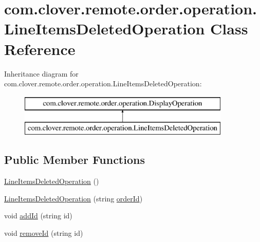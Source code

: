 \hypertarget{classcom_1_1clover_1_1remote_1_1order_1_1operation_1_1_line_items_deleted_operation}{}\section{com.\+clover.\+remote.\+order.\+operation.\+Line\+Items\+Deleted\+Operation Class Reference}
\label{classcom_1_1clover_1_1remote_1_1order_1_1operation_1_1_line_items_deleted_operation}
Inheritance diagram for com.\+clover.\+remote.\+order.\+operation.\+Line\+Items\+Deleted\+Operation\+:\begin{figure}[H]
\begin{center}
\leavevmode
\includegraphics[height=2.000000cm]{classcom_1_1clover_1_1remote_1_1order_1_1operation_1_1_line_items_deleted_operation}
\end{center}
\end{figure}
\subsection*{Public Member Functions}
\begin{DoxyCompactItemize}
\item 
\hyperlink{classcom_1_1clover_1_1remote_1_1order_1_1operation_1_1_line_items_deleted_operation_a0d25697ca76a84497704a664f4e684c6}{Line\+Items\+Deleted\+Operation} ()
\item 
\hyperlink{classcom_1_1clover_1_1remote_1_1order_1_1operation_1_1_line_items_deleted_operation_a1c3c3eaf41eb729b208e616768013e66}{Line\+Items\+Deleted\+Operation} (string \hyperlink{classcom_1_1clover_1_1remote_1_1order_1_1operation_1_1_line_items_deleted_operation_a23db6d8c7b059e21bbda7ad5c97e83c1}{order\+Id})
\item 
void \hyperlink{classcom_1_1clover_1_1remote_1_1order_1_1operation_1_1_line_items_deleted_operation_ae29814df20de1e94123619181813bad1}{add\+Id} (string id)
\item 
void \hyperlink{classcom_1_1clover_1_1remote_1_1order_1_1operation_1_1_line_items_deleted_operation_ac51fadd7e3568dd124613b8f864f849e}{remove\+Id} (string id)
\end{DoxyCompactItemize}
